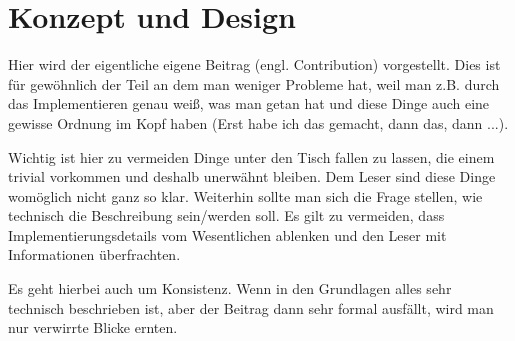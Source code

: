 
\chapter{Konzept und Design}\label{chapter:concept}

Hier wird der eigentliche eigene Beitrag (engl. Contribution) vorgestellt. 
Dies ist für gewöhnlich der Teil an dem man weniger Probleme hat, weil man z.B. durch das Implementieren genau weiß, was man getan hat und diese Dinge auch eine gewisse Ordnung im Kopf haben (Erst habe ich das gemacht, dann das, dann ...).

Wichtig ist hier zu vermeiden Dinge unter den Tisch fallen zu lassen, die einem trivial vorkommen und deshalb unerwähnt bleiben. 
Dem Leser sind diese Dinge womöglich nicht ganz so klar. 
Weiterhin sollte man sich die Frage stellen, wie technisch die Beschreibung sein/werden soll. Es gilt zu vermeiden, dass Implementierungsdetails vom Wesentlichen ablenken und den Leser mit Informationen überfrachten.

Es geht hierbei auch um Konsistenz. 
Wenn in den Grundlagen alles sehr technisch beschrieben ist, aber der Beitrag dann sehr formal ausfällt, wird man nur verwirrte Blicke ernten.
